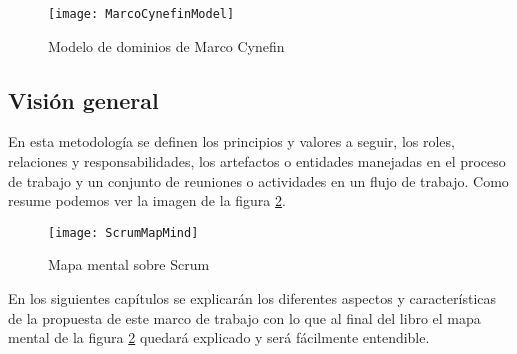 \begin{figure}[h]
  \centering
  \texttt{[image: MarcoCynefinModel]}
  \caption{Modelo de dominios de Marco Cynefin}
  \centering
  \label{fig:MarcoCynefinModel} %
\end{figure}

\subsection{Visión general}

En esta metodología se definen los principios y valores a seguir, los roles, relaciones y responsabilidades, los artefactos o entidades manejadas en el proceso de trabajo y un conjunto de reuniones o actividades en un flujo de trabajo. Como resume podemos ver la imagen de la figura \ref{fig:ScrumMapMind}.

\begin{figure}[h]
  \centering
  \texttt{[image: ScrumMapMind]}
  \caption{Mapa mental sobre Scrum}
  \centering
  \label{fig:ScrumMapMind} %
\end{figure}

En los siguientes capítulos se explicarán los diferentes aspectos y características de la propuesta de este marco de trabajo con lo que 
al final del libro el mapa mental de la figura \ref{fig:ScrumMapMind} quedará explicado y será fácilmente entendible. 
